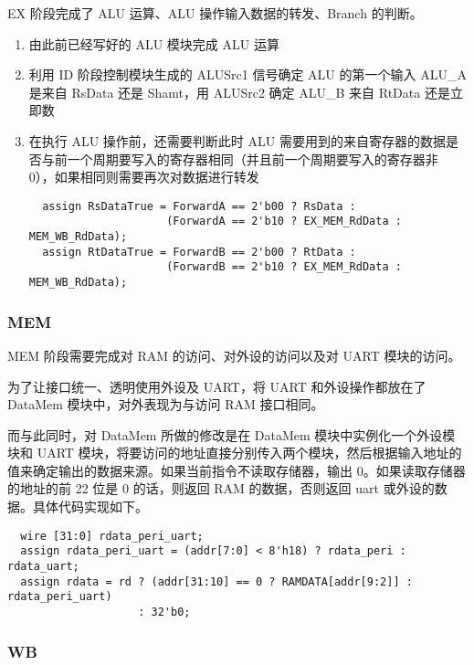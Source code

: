 \documentclass[a4paper]{article}
\begin{document}
EX 阶段完成了 ALU 运算、ALU 操作输入数据的转发、Branch 的判断。

\begin{enumerate}
  \item 由此前已经写好的 ALU 模块完成 ALU 运算
  \item 利用 ID 阶段控制模块生成的 ALUSrc1 信号确定 ALU 的第一个输入 ALU\_A 是来自 RsData 还是 Shamt，用 ALUSrc2 确定 ALU\_B 来自 RtData 还是立即数
  \item 在执行 ALU 操作前，还需要判断此时 ALU 需要用到的来自寄存器的数据是否与前一个周期要写入的寄存器相同（并且前一个周期要写入的寄存器非 0），如果相同则需要再次对数据进行转发

  \begin{verbatim}
  assign RsDataTrue = ForwardA == 2'b00 ? RsData :
                     (ForwardA == 2'b10 ? EX_MEM_RdData : MEM_WB_RdData);
  assign RtDataTrue = ForwardB == 2'b00 ? RtData :
                     (ForwardB == 2'b10 ? EX_MEM_RdData : MEM_WB_RdData);
  \end{verbatim}

\end{enumerate}

\subsubsection{MEM}
\label{subs:MEM}

MEM 阶段需要完成对 RAM 的访问、对外设的访问以及对 UART 模块的访问。

为了让接口统一、透明使用外设及 UART，将 UART 和外设操作都放在了 DataMem 模块中，对外表现为与访问 RAM 接口相同。

而与此同时，对 DataMem 所做的修改是在 DataMem 模块中实例化一个外设模块和 UART 模块，将要访问的地址直接分别传入两个模块，然后根据输入地址的值来确定输出的数据来源。如果当前指令不读取存储器，输出 0。如果读取存储器的地址的前 22 位是 0 的话，则返回 RAM 的数据，否则返回 uart 或外设的数据。具体代码实现如下。

\begin{verbatim}
  wire [31:0] rdata_peri_uart;
  assign rdata_peri_uart = (addr[7:0] < 8'h18) ? rdata_peri : rdata_uart;
  assign rdata = rd ? (addr[31:10] == 0 ? RAMDATA[addr[9:2]] : rdata_peri_uart)
                    : 32'b0;
\end{verbatim}

\subsubsection{WB}
\label{subs:WB}
\end{document}
